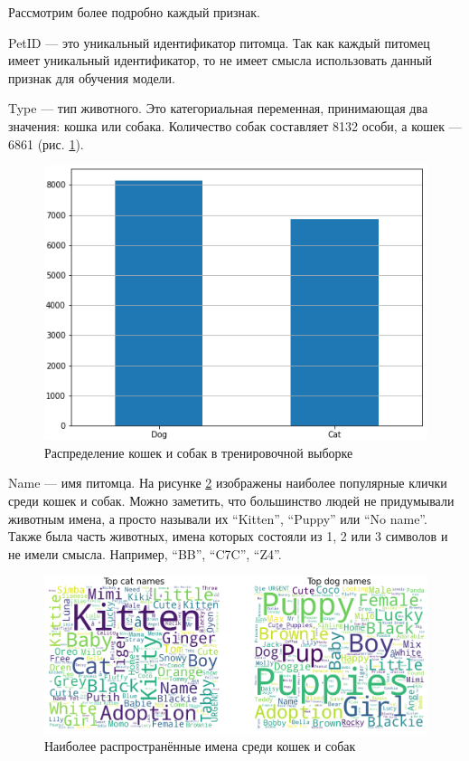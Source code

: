 \documentclass[14pt]{mmcs_article}
\begin{document}
Рассмотрим более подробно каждый признак.

PetID --- это уникальный идентификатор питомца. Так как каждый питомец имеет уникальный идентификатор, то не имеет смысла использовать данный признак для обучения модели.

Type --- тип животного. Это категориальная переменная, принимающая два значения: кошка или собака. Количество собак составляет 8132 особи, а кошек — 6861 (рис. \ref{analyse:type}).

\begin{figure}[H]
	\centering
	\includegraphics[scale=1.2]{type.png}
	\caption{Распределение кошек и собак в тренировочной выборке}\label{analyse:type}
\end{figure}

Name --- имя питомца. На рисунке \ref{analyse:names} изображены наиболее популярные клички среди кошек и собак. Можно заметить, что большинство людей не придумывали животным имена, а просто называли их “Kitten”, “Puppy” или “No name”. Также была часть животных, имена которых состояли из 1, 2 или 3 символов и не имели смысла. Например, “BB”, “C7C”, “Z4”. 

\begin{figure}[H]
	\centering
	\includegraphics[scale=0.5]{names.png}
	\caption{Наиболее распространённые имена среди кошек и собак}\label{analyse:names}
\end{figure}
\end{document}

